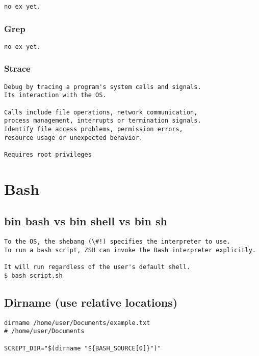 \begin{verbatim}
no ex yet.
\end{verbatim}

\subsection{Grep}

\begin{verbatim}
no ex yet.
\end{verbatim}

\subsection{Strace}

\begin{verbatim}
Debug by tracing a program's system calls and signals.
Its interaction with the OS.

Calls include file operations, network communication,
process management, interrupts or termination signals.
Identify file access problems, permission errors,
resource usage or unexpected behavior. 

Requires root privileges
\end{verbatim}

\chapter{Bash}

\section{bin bash vs bin shell vs bin sh}

\begin{verbatim}
To the OS, the shebang (\#!) specifies the interpreter to use.
To run a bash script, ZSH can invoke the Bash interpreter explicitly.

It will run regardless of the user's default shell.
$ bash script.sh
\end{verbatim}

\section{Dirname (use relative locations)}

\begin{verbatim}
dirname /home/user/Documents/example.txt
# /home/user/Documents

SCRIPT_DIR="$(dirname "${BASH_SOURCE[0]}")"
\end{verbatim}

